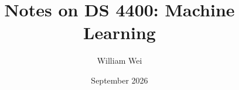 \documentclass[10pt]{article}
\title{Notes on DS 4400: Machine Learning}
\author{William Wei}
\date{September 2026}
\begin{document}
\maketitle

\tableofcontents

\pagebreak


 

%
%
%





\end{document}

